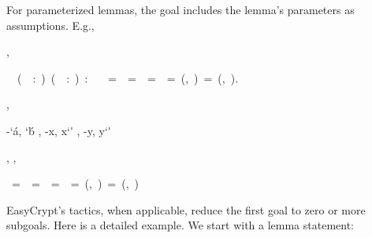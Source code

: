 \documentclass[a4paper]{article}
\begin{document}
For parameterized lemmas, the goal includes the lemma’s parameters as
assumptions. E.g.,

\begin{alectryon}
  \sep
  \begin{sentence}
    \begin{input}
      ~~(~~:~)~(~~:~)~:\nl
      ~~~=~~=\PYZgt{}~~=~~=\PYZgt{}~(,~)~=~(,~).
    \end{input}
    \sep
    \begin{output}
      \begin{goals}
        \begin{goal}
          \begin{hyps}
            \hyp{\char`\'a, \char`\'b}{}
            \sep
            \hyp{x, x\char`\'}{}
            \sep
            \hyp{y, y\char`\'}{}
          \end{hyps}
          \sep
          \infrule{}
          \sep
          \begin{conclusion}
            ~=~~=\PYZgt{}~~=~~=\PYZgt{}~(,~)~=~(,~)
          \end{conclusion}
        \end{goal}
      \end{goals}
    \end{output}
  \end{sentence}
\end{alectryon}

EasyCrypt’s tactics, when applicable, reduce the first goal to zero or
more subgoals.  Here is a detailed example.  We start with a lemma
statement:
\end{document}
